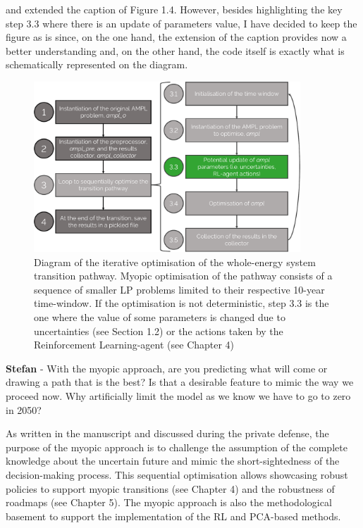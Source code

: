 \documentclass[12pt,a4paper]{article}
\begin{document}
\noindent and extended the caption of {\color{blue} Figure 1.4}. However, besides highlighting the key step 3.3 where there is an update of parameters value, I have decided to keep the figure as is since, on the one hand, the extension of the caption provides now a better understanding and, on the other hand, the code itself is exactly what is schematically represented on the diagram. 

\begin{figure}[htbp!]
\centering
\includegraphics[width=10cm]{MY_process_code.pdf}
\caption{Diagram of the iterative optimisation of the whole-energy system transition pathway. Myopic optimisation of the pathway consists of a sequence of smaller LP problems limited to their respective 10-year time-window. If the optimisation is not deterministic, step 3.3 is the one where the value of some parameters is changed due to uncertainties (see Section 1.2) or the actions taken by the Reinforcement Learning-agent (see Chapter 4)}
\label{fig:MY_process_code}
\end{figure}

\begin{mdframed}[style=comment] %
{\color{teal} \textbf{Stefan}} - With the myopic approach, are you predicting what will come or drawing a path that is the best? Is that a desirable feature to mimic the way we proceed now. Why artificially limit the model as we know we have to go to zero in 2050?
\end{mdframed}

\noindent As written in the manuscript and discussed during the private defense, the purpose of the myopic approach is to challenge the assumption of the complete knowledge about the uncertain future and mimic the short-sightedness of the decision-making process. This sequential optimisation allows showcasing robust policies to support myopic transitions (see Chapter 4) and the robustness of roadmaps (see Chapter 5). The myopic approach is also the methodological basement to support the implementation of the RL and PCA-based methods. 
\end{document}
